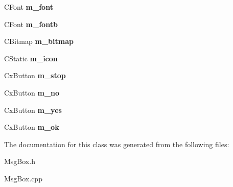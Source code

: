 \begin{DoxyCompactItemize}
\item 
\hypertarget{class_c_msg_box_a6f70e84afba2899145dd7d019d0bc27d}{C\-Font {\bfseries m\-\_\-font}}\label{class_c_msg_box_a6f70e84afba2899145dd7d019d0bc27d}

\item 
\hypertarget{class_c_msg_box_a894b67fd995b5f4d7726e5016e45df08}{C\-Font {\bfseries m\-\_\-fontb}}\label{class_c_msg_box_a894b67fd995b5f4d7726e5016e45df08}

\item 
\hypertarget{class_c_msg_box_ac584587e10ea4f6d60bd6755ac8dd633}{C\-Bitmap {\bfseries m\-\_\-bitmap}}\label{class_c_msg_box_ac584587e10ea4f6d60bd6755ac8dd633}

\item 
\hypertarget{class_c_msg_box_af113abf9855994fb467e002955c70de4}{C\-Static {\bfseries m\-\_\-icon}}\label{class_c_msg_box_af113abf9855994fb467e002955c70de4}

\item 
\hypertarget{class_c_msg_box_ab5dd218cac53dca1cbea08285a836032}{Cx\-Button {\bfseries m\-\_\-stop}}\label{class_c_msg_box_ab5dd218cac53dca1cbea08285a836032}

\item 
\hypertarget{class_c_msg_box_a42e2d77987bac2fea428279b2741c904}{Cx\-Button {\bfseries m\-\_\-no}}\label{class_c_msg_box_a42e2d77987bac2fea428279b2741c904}

\item 
\hypertarget{class_c_msg_box_a61fd4355e25be48f7c77cb9a231d7f9f}{Cx\-Button {\bfseries m\-\_\-yes}}\label{class_c_msg_box_a61fd4355e25be48f7c77cb9a231d7f9f}

\item 
\hypertarget{class_c_msg_box_ac6d7990fe4b9ad5545dcb8ce8bc2deeb}{Cx\-Button {\bfseries m\-\_\-ok}}\label{class_c_msg_box_ac6d7990fe4b9ad5545dcb8ce8bc2deeb}

\end{DoxyCompactItemize}


The documentation for this class was generated from the following files\-:\begin{DoxyCompactItemize}
\item 
Msg\-Box.\-h\item 
Msg\-Box.\-cpp\end{DoxyCompactItemize}
